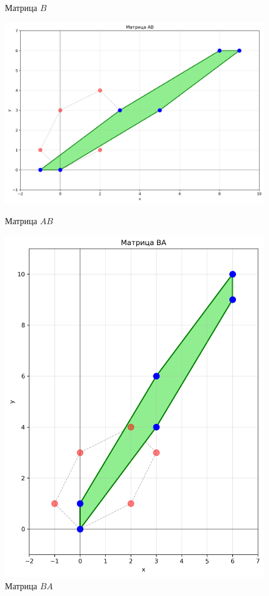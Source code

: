 \begin{figure}[h]
\begin{minipage}{0.23\textwidth}
\caption{Матрица $B$}
\label{fig:matrix_B}
\end{minipage}
\hfill
\begin{minipage}{0.23\textwidth}
\centering
\includegraphics[width=\textwidth]{images/task1/matrix_AB.png}
\caption{Матрица $AB$}
\label{fig:matrix_AB}
\end{minipage}
\hfill
\begin{minipage}{0.23\textwidth}
\centering
\includegraphics[width=\textwidth]{images/task1/matrix_BA.png}
\caption{Матрица $BA$}
\label{fig:matrix_BA}
\end{minipage}
\end{figure}

